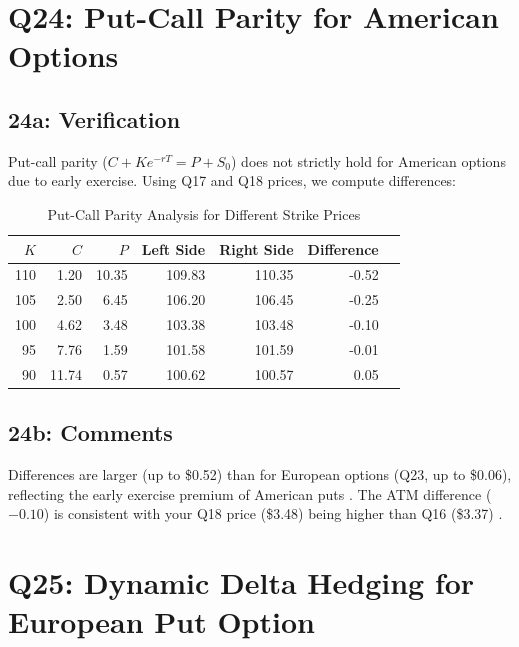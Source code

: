 \documentclass{article}
\begin{document}
\section*{Q24: Put-Call Parity for American Options}

\subsection*{24a: Verification}

Put-call parity ($C + Ke^{-rT} = P + S_0$) does not strictly hold for American options due to early exercise. Using Q17 and Q18 prices, we compute differences:

\begin{table}[h]
\centering
\caption{Put-Call Parity Analysis for Different Strike Prices}
\begin{tabular}{rrrrrrr}
\toprule
$K$ & $C$ & $P$ & Left Side & Right Side & Difference \\
\midrule
110 & 1.20 & 10.35 & 109.83 & 110.35 & -0.52 \\
105 & 2.50 & 6.45 & 106.20 & 106.45 & -0.25 \\
100 & 4.62 & 3.48 & 103.38 & 103.48 & -0.10 \\
95 & 7.76 & 1.59 & 101.58 & 101.59 & -0.01 \\
90 & 11.74 & 0.57 & 100.62 & 100.57 & 0.05 \\
\bottomrule
\end{tabular}
\end{table}

\subsection*{24b: Comments}

Differences are larger (up to \$0.52) than for European options (Q23, up to \$0.06), reflecting the early exercise premium of American puts \citep{hull2018options}. The ATM difference ($-0.10$) is consistent with your Q18 price (\$3.48) being higher than Q16 (\$3.37) \citep{shreve2004stochastic}.



\section*{Q25: Dynamic Delta Hedging for European Put Option}
\end{document}

